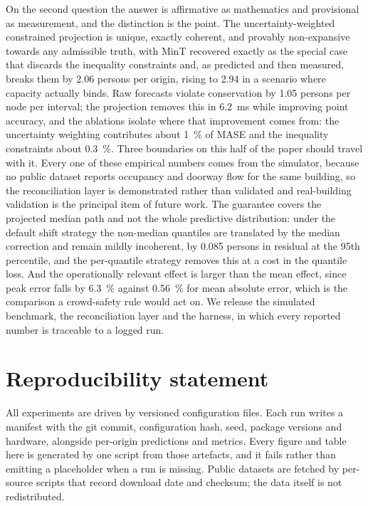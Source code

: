\documentclass[11pt]{article}
\theoremstyle{plain}
\theoremstyle{definition}
\theoremstyle{remark}
\newif\ifrevisionmarkup
\newcommand{\new}[1]{\ifrevisionmarkup\textcolor{revision}{#1}\else#1\fi}
\begin{document}
On the second question the answer \new{is affirmative as mathematics and provisional as measurement, and the distinction is the point}. The uncertainty-weighted constrained projection is unique, exactly coherent, and provably non-expansive towards any admissible truth, with MinT recovered exactly as the special case that discards the inequality constraints and, as predicted and then measured, breaks them by \num{2.06} persons per origin, rising to \num{2.94} in a scenario where capacity actually binds. Raw forecasts violate conservation by \num{1.05} persons per node per interval; the projection removes this in \SI{6.2}{\milli\second} while improving point accuracy, and the ablations isolate where that improvement comes from: the uncertainty weighting contributes about \SI{1}{\percent} of MASE and the inequality constraints about \SI{0.3}{\percent}. \new{Three boundaries on this half of the paper should travel with it. Every one of these empirical numbers comes from the simulator, because no public dataset reports occupancy and doorway flow for the same building, so the reconciliation layer is demonstrated rather than validated and real-building validation is the principal item of future work. The guarantee covers the projected median path and not the whole predictive distribution: under the default shift strategy the non-median quantiles are translated by the median correction and remain mildly incoherent, by \num{0.085} persons in residual at the \num{95}th percentile, and the per-quantile strategy removes this at a cost in the quantile loss. And the operationally relevant effect is larger than the mean effect, since peak error falls by \SI{6.3}{\percent} against \SI{0.56}{\percent} for mean absolute error, which is the comparison a crowd-safety rule would act on.} We release the simulated benchmark, the reconciliation layer and the harness, in which every reported number is traceable to a logged run.

\section*{Reproducibility statement}

All experiments are driven by versioned configuration files. Each run writes a manifest with the git commit, configuration hash, seed, package versions and hardware, alongside per-origin predictions and metrics. Every figure and table here is generated by one script from those artefacts, and it fails rather than emitting a placeholder when a run is missing. Public datasets are fetched by per-source scripts that record download date and checksum; the data itself is not redistributed.
\end{document}
